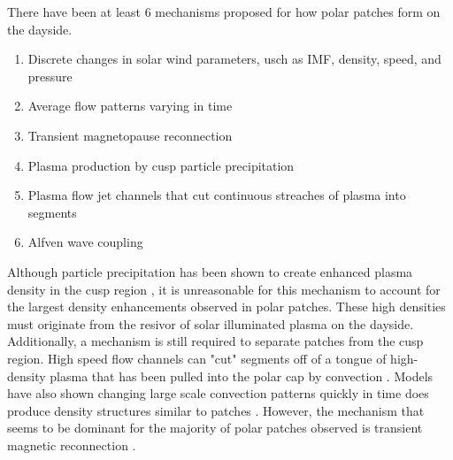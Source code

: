 There have been at least 6 mechanisms proposed for how polar patches form on the dayside.
\begin{enumerate}
	\item Discrete changes in solar wind parameters, usch as IMF, density, speed, and pressure \citep{Sojka1994}
	\item Average flow patterns varying in time \citep{Anderson1988}
	\item Transient magnetopause reconnection \citep{Lockwook1992b}
	\item Plasma production by cusp particle precipitation \citep{Rodger1994,Millward1999}
	\item Plasma flow jet channels that cut continuous streaches of plasma into segments 	\citep{Valladares1998}
	\item Alfven wave coupling \citep{Prikryl1999}
\end{enumerate}
Although particle precipitation has been shown to create enhanced plasma density in the cusp region \citep{Roger1994}, it is unreasonable for this mechanism to account for the largest density enhancements observed in polar patches.  These high densities must originate from the resivor of solar illuminated plasma on the dayside.  Additionally, a mechanism is still required to separate patches from the cusp region.  High speed flow channels can "cut" segments off of a tongue of high-density plasma that has been pulled into the polar cap by convection \citep{Valladares1994,Valladares1998}.  Models have also shown changing large scale convection patterns quickly in time does produce density structures similar to patches \citep{Anderson1988}.  However, the mechanism that seems to be dominant for the majority of polar patches observed is transient magnetic reconnection \citep{Carlson2012}.

